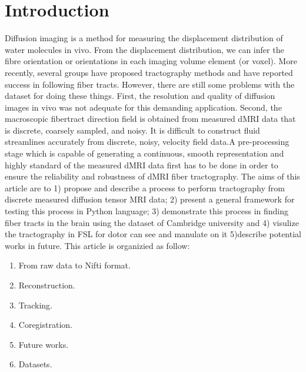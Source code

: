 

\section{Introduction}
Diffusion imaging is a method for measuring the displacement distribution of water molecules in vivo. From the displacement distribution, we can infer the fibre orientation or orientations in each imaging volume element (or voxel). More recently, several groups have proposed tractography methods and have reported success in following fiber tracts. However, there are still some problems with the dataset for doing these things. First, the resolution and quality of diffusion images in vivo was not adequate for this demanding application. Second, the macroscopic fibertract direction field is obtained from measured dMRI data that is discrete, coarsely sampled, and noisy. It is difficult to construct fluid streamlines accurately from discrete, noisy, velocity field data.A pre-processing stage which is capable of generating a continuous, smooth representation and highly standard of the measured dMRI data first has to be done in order to ensure the reliability and robustness of dMRI fiber tractography. The aims of this article are to 1) propose and describe a process to perform tractography from discrete measured diffusion tensor MRI data; 2) present a general framework for testing this process in Python language; 3) demonstrate this process in finding fiber tracts in the brain using the dataset of Cambridge university and 4) visulize the tractography in FSL for dotor can see and manulate on it 5)describe potential works in future. This article is organizied as follow:
\begin{enumerate}
\item From raw data to Nifti format.
\item Reconstruction.
\item Tracking.
\item Coregistration.
\item Future works.
\item Datasets.
\end{enumerate}
	


